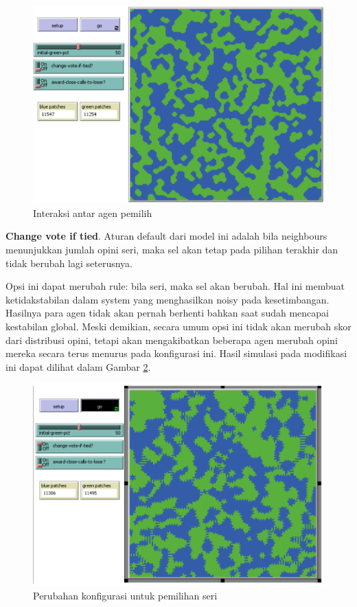 \begin{figure}[H]
	\centering
	\includegraphics[width=\linewidth]{images/ch03/Voter2}
	\caption{Interaksi antar agen pemilih}
	\label{fig:voter2}
\end{figure}

\textbf{Change vote if tied}. Aturan default dari model ini adalah bila neighbours menunjukkan jumlah opini seri, maka sel akan tetap pada pilihan terakhir dan tidak berubah lagi seterusnya.

Opsi ini dapat merubah rule: bila seri, maka sel akan berubah. Hal ini membuat ketidakstabilan  dalam system yang menghasilkan noisy pada kesetimbangan. Hasilnya para agen tidak akan pernah berhenti bahkan saat sudah mencapai kestabilan global. Meski demikian, secara umum opsi ini tidak akan merubah skor dari distribusi opini, tetapi akan mengakibatkan beberapa agen merubah opini mereka secara terus menurus pada konfigurasi ini. Hasil simulasi pada modifikasi ini dapat dilihat dalam Gambar \ref{fig:voter3}.

\begin{figure}[H]
	\centering
	\includegraphics[width=\linewidth]{images/ch03/Voter3}
	\caption{Perubahan konfigurasi untuk pemilihan seri}
	\label{fig:voter3}
\end{figure}

